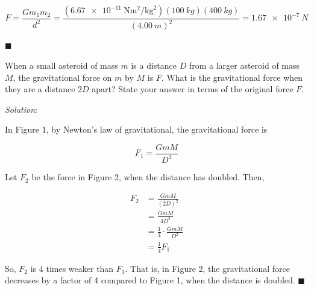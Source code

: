 \documentclass[dvipsnames]{article}
\begin{document}
\begin{equation*}
    F = \frac{G m_1 m_2}{d^2} = 
    \frac{\left(\SI[per-mode=fraction]{6.67e-11}{\newton\meter\tothe{2}\per\kilogram\tothe{2}}\right) (\SI{100}{kg}) (\SI{400}{kg})}{\left(\SI{4.00}{m}\right)^2} = 
    \boxed{\SI{1.67e-7}{N}}
\end{equation*}

\hfill $\blacksquare$


\begin{example}
When a small asteroid of mass $m$ is a distance $D$ from a larger asteroid of mass $M$, the gravitational force on $m$ by $M$ is $F$. What is the gravitational force when they are a distance $2D$ apart? State your answer in terms of the original force $F$.

\begin{center}
\hspace{1.5cm}
\end{center}
\end{example}

\textit{Solution}:

In Figure 1, by Newton's law of gravitational, the gravitational force is

\begin{equation*}
    F_1 = \frac{GmM}{D^2}
\end{equation*}

Let $F_2$ be the force in Figure 2, when the distance has doubled. Then,

\begin{align*}
    F_2 &= \frac{G m M}{(2D)^2} \\[1.5ex]
    &= \frac{GmM}{4D^2} \\[1.5ex]
    &= \frac{1}{4} \cdot \frac{GmM}{D^2} \\[1.5ex]
    &= \frac{1}{4} F_1
\end{align*}

So, $F_2$ is 4 times weaker than $F_1$. That is, in Figure 2, the gravitational force decreases by a factor of 4 compared to Figure 1, when the distance is doubled. \hfill $\blacksquare$
\end{document}
